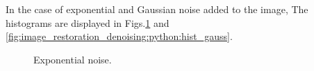 \vspace*{-7pt}

In the case of exponential and Gaussian noise added to the image, The histograms are displayed in Figs.\ref{fig:image_restoration_denoising:python:hist_exp} and \ref{fig:image_restoration_denoising:python:hist_gauss}.

\vspace*{-7pt}

\begin{figure}[H]
 \centering\caption{Exponential noise.}%
 \hfill
\vspace*{-8pt}%
  \label{fig:image_restoration_denoising:python:hist_exp}%
\end{figure}

\vspace*{-15pt}

